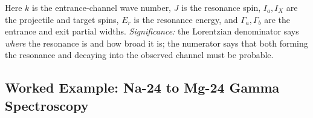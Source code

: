 Here $k$ is the entrance-channel wave number, $J$ is the resonance spin,
$I_a,I_X$ are the projectile and target spins, $E_r$ is the resonance energy,
and $\Gamma_a,\Gamma_b$ are the entrance and exit partial widths.
\textit{Significance:} the Lorentzian denominator says \emph{where} the
resonance is and how broad it is; the numerator says that both forming the
resonance and decaying into the observed channel must be probable.

\subsection{Worked Example: Na-24 to Mg-24 Gamma Spectroscopy}
\label{subsec:lec10:na24_exercise}

